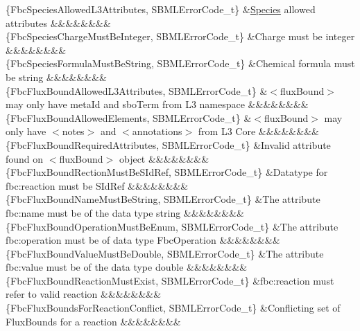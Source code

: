 \begin{DoxyParagraph}{}
\begin{longtabu}
\{Fbc\+Species\+Allowed\+L3\+Attributes, S\+B\+M\+L\+Error\+Code\+\_\+t\} &\hyperlink{class_species}{Species} allowed attributes &&&&&&&&\\
\{Fbc\+Species\+Charge\+Must\+Be\+Integer, S\+B\+M\+L\+Error\+Code\+\_\+t\} &Charge must be integer &&&&&&&&\\
\{Fbc\+Species\+Formula\+Must\+Be\+String, S\+B\+M\+L\+Error\+Code\+\_\+t\} &Chemical formula must be string &&&&&&&&\\
\{Fbc\+Flux\+Bound\+Allowed\+L3\+Attributes, S\+B\+M\+L\+Error\+Code\+\_\+t\} &{\ttfamily $<$flux\+Bound$>$} may only have \textquotesingle{}meta\+Id\textquotesingle{} and \textquotesingle{}sbo\+Term\textquotesingle{} from L3 namespace &&&&&&&&\\
\{Fbc\+Flux\+Bound\+Allowed\+Elements, S\+B\+M\+L\+Error\+Code\+\_\+t\} &{\ttfamily $<$flux\+Bound$>$} may only have {\ttfamily $<$notes$>$} and {\ttfamily $<$annotations$>$} from L3 Core &&&&&&&&\\
\{Fbc\+Flux\+Bound\+Required\+Attributes, S\+B\+M\+L\+Error\+Code\+\_\+t\} &Invalid attribute found on {\ttfamily $<$flux\+Bound$>$} object &&&&&&&&\\
\{Fbc\+Flux\+Bound\+Rection\+Must\+Be\+S\+Id\+Ref, S\+B\+M\+L\+Error\+Code\+\_\+t\} &Datatype for \textquotesingle{}fbc\+:reaction\textquotesingle{} must be S\+Id\+Ref &&&&&&&&\\
\{Fbc\+Flux\+Bound\+Name\+Must\+Be\+String, S\+B\+M\+L\+Error\+Code\+\_\+t\} &The attribute \textquotesingle{}fbc\+:name\textquotesingle{} must be of the data type string &&&&&&&&\\
\{Fbc\+Flux\+Bound\+Operation\+Must\+Be\+Enum, S\+B\+M\+L\+Error\+Code\+\_\+t\} &The attribute \textquotesingle{}fbc\+:operation\textquotesingle{} must be of data type Fbc\+Operation &&&&&&&&\\
\{Fbc\+Flux\+Bound\+Value\+Must\+Be\+Double, S\+B\+M\+L\+Error\+Code\+\_\+t\} &The attribute \textquotesingle{}fbc\+:value\textquotesingle{} must be of the data type double &&&&&&&&\\
\{Fbc\+Flux\+Bound\+Reaction\+Must\+Exist, S\+B\+M\+L\+Error\+Code\+\_\+t\} &\textquotesingle{}fbc\+:reaction\textquotesingle{} must refer to valid reaction &&&&&&&&\\
\{Fbc\+Flux\+Bounds\+For\+Reaction\+Conflict, S\+B\+M\+L\+Error\+Code\+\_\+t\} &Conflicting set of Flux\+Bounds for a reaction &&&&&&&&\\

\end{longtabu}
\end{DoxyParagraph}
